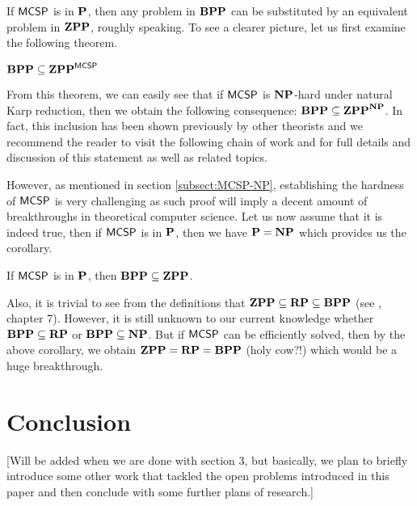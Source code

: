 \documentclass[11pt]{article}
\begin{document}
If $\mathprob{MCSP}$ is in $\P$, then any problem in $\BPP$ can be substituted by an equivalent problem in $\ZPP$, roughly speaking. To see a clearer picture, let us first examine the following theorem.

\begin{theorem}[\cite{10.1145/335305.335314}]
	$\BPP \subseteq \ZPP^{\mathprob{MCSP}}$
\end{theorem}

From this theorem, we can easily see that if $\mathprob{MCSP}$ is $\NP$-hard under natural Karp reduction, then we obtain the following consequence: $\BPP \subseteq \ZPP^{\NP}$. In fact, this inclusion has been shown previously by other theorists and we recommend the reader to visit the following chain of work \cite{10.1145/800061.808762} \cite{Zachos1986ADC} \cite{LAUTEMANN1983215} \cite{NISAN1994149} and \cite{article} for full details and discussion of this statement as well as related topics.

However, as mentioned in section \ref{subsect:MCSP-NP}, establishing the hardness of $\mathprob{MCSP}$ is very challenging as such proof will imply a decent amount of breakthroughs in theoretical computer science. Let us now assume that it is indeed true, then if $\mathprob{MCSP}$ is in $\P$, then we have $\P = \NP$ which provides us the corollary.

\begin{corollary}
	If $\mathprob{MCSP}$ is in $\P$, then $\BPP \subseteq \ZPP$.
\end{corollary}

Also, it is trivial to see from the definitions that $\ZPP \subseteq \RP \subseteq \BPP$ (see \cite{arora2009}, chapter 7). However, it is still unknown to our current knowledge whether $\BPP \subseteq \RP$ or $\BPP \subseteq \NP$. But if $\mathprob{MCSP}$ can be efficiently solved, then by the above corollary, we obtain $\ZPP = \RP = \BPP$ (holy cow?!) which would be a huge breakthrough.
 
\section{Conclusion}

[Will be added when we are done with section 3, but basically, we plan to briefly introduce some other work that tackled the open problems introduced in this paper and then conclude with some further plans of research.]



\end{document}
